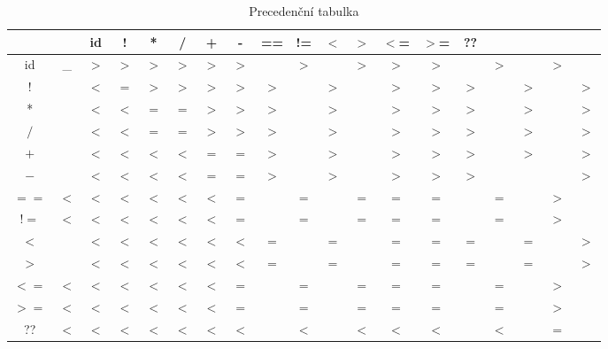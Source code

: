 \begin{table}[p]
\caption{Precedenční tabulka}
\begin{tabular}{c|cccccccccccccccccc}
\toprule
&&id&!&*&/&+&-&==&!=&$<$&$>$&$<$=&$>$=&??&&&&\\
\midrule
id &\_&$>$&$>$&$>$&$>$&$>$&$>$&&$>$&&$>$&$>$&$>$&&$>$&&$>$&\\
$!$     &&$<$&$=$&$>$&$>$&$>$&$>$&$>$&&$>$&&$>$&$>$&$>$&&$>$&&$>$\\
*       &&$<$&$<$&$=$&$=$&$>$&$>$&$>$&&$>$&&$>$&$>$&$>$&&$>$&&$>$\\
$/$     &&$<$&$<$&$=$&$=$&$>$&$>$&$>$&&$>$&&$>$&$>$&$>$&&$>$&&$>$\\
$+$     &&$<$&$<$&$<$&$<$&$=$&$=$&$>$&&$>$&&$>$&$>$&$>$&&$>$&&$>$\\
$-$     &&$<$&$<$&$<$&$<$&$=$&$=$&$>$&&$>$&&$>$&$>$&$>$&&&&$>$\\
$==$ &$<$&$<$&$<$&$<$&$<$&$<$&$=$&&$=$&&$=$&$=$&$=$&&$=$&&$>$&\\
$!=$ &$<$&$<$&$<$&$<$&$<$&$<$&$=$&&$=$&&$=$&$=$&$=$&&$=$&&$>$&\\
$<$     &&$<$&$<$&$<$&$<$&$<$&$<$&$=$&&$=$&&$=$&$=$&$=$&&$=$&&$>$\\
$>$     &&$<$&$<$&$<$&$<$&$<$&$<$&$=$&&$=$&&$=$&$=$&$=$&&$=$&&$>$\\
$<=$ &$<$&$<$&$<$&$<$&$<$&$<$&$=$&&$=$&&$=$&$=$&$=$&&$=$&&$>$&\\
$>=$ &$<$&$<$&$<$&$<$&$<$&$<$&$=$&&$=$&&$=$&$=$&$=$&&$=$&&$>$&\\
??   &$<$&$<$&$<$&$<$&$<$&$<$&$<$&&$<$&&$<$&$<$&$<$&&$<$&&$=$&\\
\bottomrule
\end{tabular}
\end{table}

